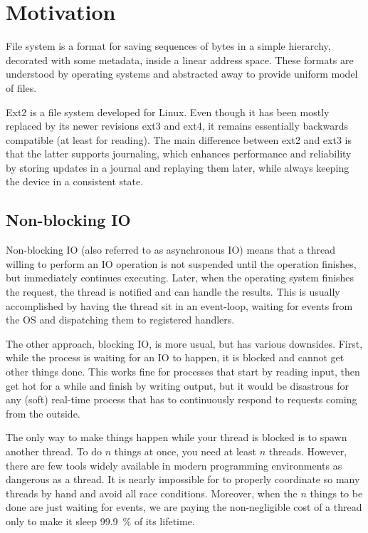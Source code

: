 \chapter{Motivation}

File system is a format for saving sequences of bytes in a simple hierarchy,
decorated with some metadata, inside a linear address space. These formats are
understood by operating systems and abstracted away to provide uniform model of
files.

Ext2 is a file system developed for Linux. Even though it has been mostly
replaced by its newer revisions ext3 and ext4, it remains essentially backwards
compatible (at least for reading). The main difference between ext2 and ext3 is
that the latter supports journaling, which enhances performance and reliability
by storing updates in a journal and replaying them later, while always keeping
the device in a consistent state.

\section{Non-blocking IO}

Non-blocking IO (also referred to as asynchronous IO) means that a thread
willing to perform an IO operation is not suspended until the operation
finishes, but immediately continues executing. Later, when the operating system
finishes the request, the thread is notified and can handle the results. This is
usually accomplished by having the thread sit in an event-loop, waiting for
events from the OS and dispatching them to registered handlers.

The other approach, blocking IO, is more usual, but has various downsides.
First, while the process is waiting for an IO to happen, it is blocked and
cannot get other things done. This works fine for processes that start by
reading input, then get hot for a while and finish by writing output, but it
would be disastrous for any (soft) real-time process that has to continuously
respond to requests coming from the outside.

The only way to make things happen while your thread is blocked is to spawn
another thread. To do $n$ things at once, you need at least $n$ threads.
However, there are few tools widely available in modern programming environments
as dangerous as a thread. It is nearly impossible for to properly coordinate so
many threads by hand and avoid all race conditions. Moreover, when the $n$
things to be done are just waiting for events, we are paying the non-negligible
cost of a thread only to make it sleep 99.9~\% of its lifetime.

